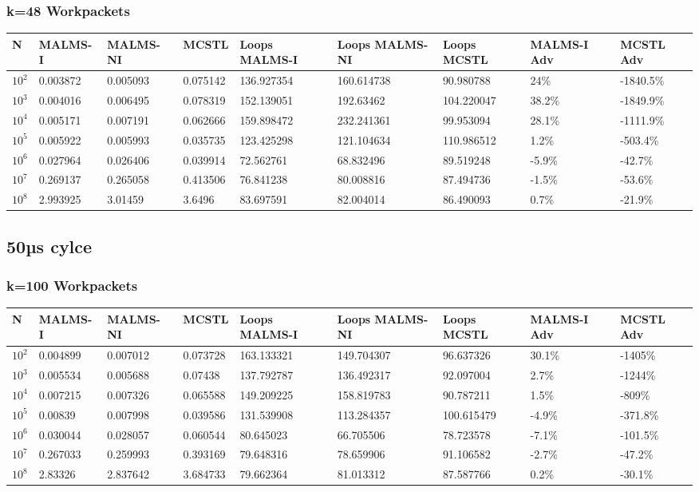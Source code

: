 \documentclass[landscape]{article}
\begin{document}
\subsubsection{k=48 Workpackets}
\begin{tabular}{l|l|l|l|l|l|l|l|l}
N	& MALMS-I 	& MALMS-NI	& MCSTL		& Loops MALMS-I	& Loops MALMS-NI & Loops MCSTL & MALMS-I Adv	& MCSTL Adv		\\
\hline
$10^2$		& 0.003872	& 0.005093	& 0.075142	& 136.927354	& 160.614738	& 90.980788	& 24\%  	& -1840.5\% \\
$10^3$		& 0.004016	& 0.006495	& 0.078319	& 152.139051	& 192.63462	& 104.220047	& 38.2\%  	& -1849.9\% \\
$10^4$		& 0.005171	& 0.007191	& 0.062666	& 159.898472	& 232.241361	& 99.953094	& 28.1\%  	& -1111.9\% \\
$10^5$		& 0.005922	& 0.005993	& 0.035735	& 123.425298	& 121.104634	& 110.986512	& 1.2\%  	& -503.4\% \\
$10^6$		& 0.027964	& 0.026406	& 0.039914	& 72.562761	& 68.832496	& 89.519248	& -5.9\%  	& -42.7\% \\
$10^7$		& 0.269137	& 0.265058	& 0.413506	& 76.841238	& 80.008816	& 87.494736	& -1.5\%  	& -53.6\% \\
$10^8$		& 2.993925	& 3.01459	& 3.6496	& 83.697591	& 82.004014	& 86.490093	& 0.7\%  	& -21.9\% \\
\end{tabular}
\subsection*{50µs cylce}
\subsubsection{k=100 Workpackets}
\begin{tabular}{l|l|l|l|l|l|l|l|l}
N	& MALMS-I 	& MALMS-NI	& MCSTL		& Loops MALMS-I	& Loops MALMS-NI & Loops MCSTL & MALMS-I Adv	& MCSTL Adv		\\
\hline
$10^2$		& 0.004899	& 0.007012	& 0.073728	& 163.133321	& 149.704307	& 96.637326	& 30.1\%  	& -1405\% \\
$10^3$		& 0.005534	& 0.005688	& 0.07438	& 137.792787	& 136.492317	& 92.097004	& 2.7\%  	& -1244\% \\
$10^4$		& 0.007215	& 0.007326	& 0.065588	& 149.209225	& 158.819783	& 90.787211	& 1.5\%  	& -809\% \\
$10^5$		& 0.00839	& 0.007998	& 0.039586	& 131.539908	& 113.284357	& 100.615479	& -4.9\%  	& -371.8\% \\
$10^6$		& 0.030044	& 0.028057	& 0.060544	& 80.645023	& 66.705506	& 78.723578	& -7.1\%  	& -101.5\% \\
$10^7$		& 0.267033	& 0.259993	& 0.393169	& 79.648316	& 78.659906	& 91.106582	& -2.7\%  	& -47.2\% \\
$10^8$		& 2.83326	& 2.837642	& 3.684733	& 79.662364	& 81.013312	& 87.587766	& 0.2\%  	& -30.1\% \\
\end{tabular}
\end{document}
